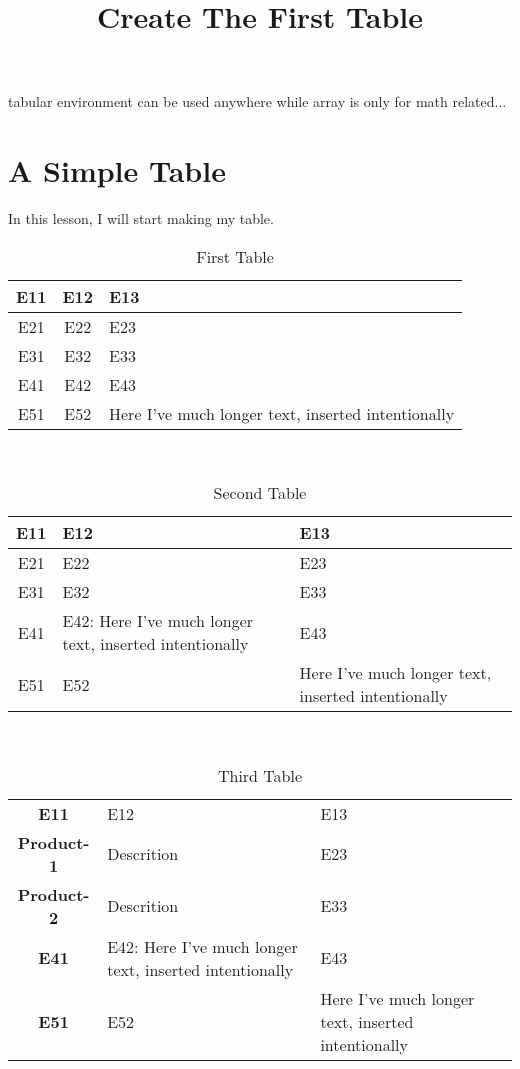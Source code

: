 \documentclass{article}
\title{Create The First Table}
\author{}
\date{}
\begin{document}
	tabular environment can be used anywhere while array is only for math related...
	\section{A Simple Table}
	In this lesson, I will start making my table. \\
	\begin{table}[p]
		\caption{First Table}
		\centering
		\begin{tabular}{| c | c | p{4cm} | }
			E11 & E12 & E13 \\ \hline  %
			E21 & E22 & E23 \\
			E31 & E32 & E33 \\
			E41 & E42 & E43 \\
			E51 & E52 & Here I've much longer text, inserted intentionally
		\end{tabular} \\
  \end{table}


\begin{table}[p]
	\caption{Second Table}
	\centering
	\begin{tabular}{| c | m{4cm} | m{4cm} | }
		E11 & E12 & E13 \\ \hline  %
		E21 & E22 & E23 \\
		E31 & E32 & E33 \\
		E41 & E42: Here I've much longer text, inserted intentionally & E43 \\
		E51 & E52 & Here I've much longer text, inserted intentionally
	\end{tabular} \\
\end{table}



\begin{table}[p]
	\caption{Third Table}
	\centering
	\begin{tabular}{ >{\bfseries}c  m{4cm}  m{4cm}  }
		\toprule[0.16em]
		E11 & E12 & E13 \\ 
		Product-1 & Descrition & E23 \\
		Product-2 & Descrition & E33 \\
		\midrule
		E41 & E42: Here I've much longer text, inserted intentionally & E43  \\
		E51 & E52 & Here I've much longer text, inserted intentionally  \\
		\bottomrule
	\end{tabular} \\
\end{table}
\end{document}
